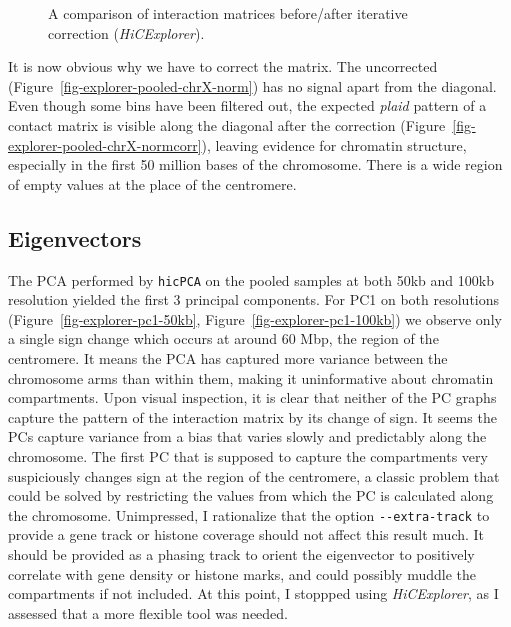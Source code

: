 \documentclass[
  11pt,
  a4paper,
]{scrbook}
\let\oldemph\emph
\renewcommand\emph[1]{\oldemph{\color{gray}#1}}
\begin{document}
\begin{figure}
\begin{minipage}{0.50\linewidth}
{}


\end{minipage}%

\caption{\label{fig-explorer-pooled-norm-normcorr}A comparison of
interaction matrices before/after iterative correction
(\emph{HiCExplorer}).}

\end{figure}%

It is now obvious why we have to correct the matrix. The uncorrected
(Figure~\ref{fig-explorer-pooled-chrX-norm}) has no signal apart from
the diagonal. Even though some bins have been filtered out, the expected
\emph{plaid} pattern of a contact matrix is visible along the diagonal
after the correction (Figure~\ref{fig-explorer-pooled-chrX-normcorr}),
leaving evidence for chromatin structure, especially in the first 50
million bases of the chromosome. There is a wide region of empty values
at the place of the centromere.

\subsection{Eigenvectors}\label{eigenvectors}

The PCA performed by \texttt{hicPCA} on the pooled samples at both 50kb
and 100kb resolution yielded the first 3 principal components. For PC1
on both resolutions (Figure~\ref{fig-explorer-pc1-50kb},
Figure~\ref{fig-explorer-pc1-100kb}) we observe only a single sign
change which occurs at around 60 Mbp, the region of the centromere. It
means the PCA has captured more variance between the chromosome arms
than within them, making it uninformative about chromatin compartments.
Upon visual inspection, it is clear that neither of the PC graphs
capture the pattern of the interaction matrix by its change of sign. It
seems the PCs capture variance from a bias that varies slowly and
predictably along the chromosome. The first PC that is supposed to
capture the compartments very suspiciously changes sign at the region of
the centromere, a classic problem that could be solved by restricting
the values from which the PC is calculated along the chromosome.
Unimpressed, I rationalize that the option \texttt{-\/-extra-track} to
provide a gene track or histone coverage should not affect this result
much. It should be provided as a phasing track to orient the eigenvector
to positively correlate with gene density or histone marks, and could
possibly muddle the compartments if not included. At this point, I
stoppped using \emph{HiCExplorer}, as I assessed that a more flexible
tool was needed.
\end{document}
